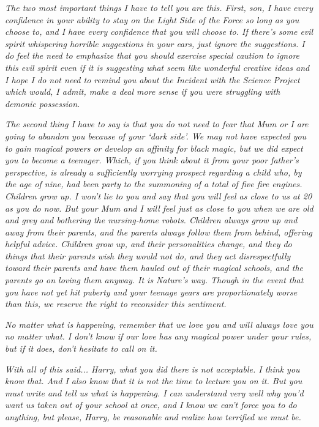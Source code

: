 \emph{The two most important things I have to tell you are this. First, son, I have} \emph{every} \emph{confidence in your ability to stay on the Light Side of the Force so long as you choose to, and I have every confidence that you will choose to. If there's some evil spirit whispering horrible suggestions in your ears, just ignore the suggestions. I} \emph{do} \emph{feel the need to emphasize that you should exercise special caution to ignore this evil spirit even if it is suggesting what seem like wonderful creative ideas and I hope I do not need to remind you about the Incident with the Science Project which would, I admit, make a deal more sense if you were struggling with demonic possession.}

\emph{The second thing I have to say is that you do not need to fear that Mum or I are going to abandon you because of your `dark side'. We may not have expected you to gain magical powers or develop an affinity for black magic, but we did expect you to become a teenager. Which, if you think about it from your poor father's perspective, is already a sufficiently worrying prospect regarding a child who, by the age of nine, had been party to the summoning of a total of five fire engines. Children grow up. I won't lie to you and say that you will feel as close to us at 20 as you do now. But your Mum and I will feel just as close to you when we are old and grey and bothering the nursing-home robots. Children always grow up and away from their parents, and the parents always follow them from behind, offering helpful advice. Children grow up, and their personalities change, and they do things that their parents wish they would not do, and they act disrespectfully toward their parents and have them hauled out of their magical schools, and the parents go on loving them anyway. It is Nature's way. Though in the event that you have not yet hit puberty and your teenage years are proportionately worse than this, we reserve the right to reconsider this sentiment.}

\emph{No matter what is happening, remember that we love you and will always love you no matter what. I don't know if our love has any magical power under your rules, but if it does, don't hesitate to call on it.}

\emph{With all of this said... Harry, what you did there is not acceptable. I think you know that. And I also know that it is not the time to lecture you on it. But you must write and tell us what is happening. I can understand very well why you'd want us taken out of your school at once, and I know we can't force you to do anything, but please, Harry, be reasonable and realize how terrified we must be.}

